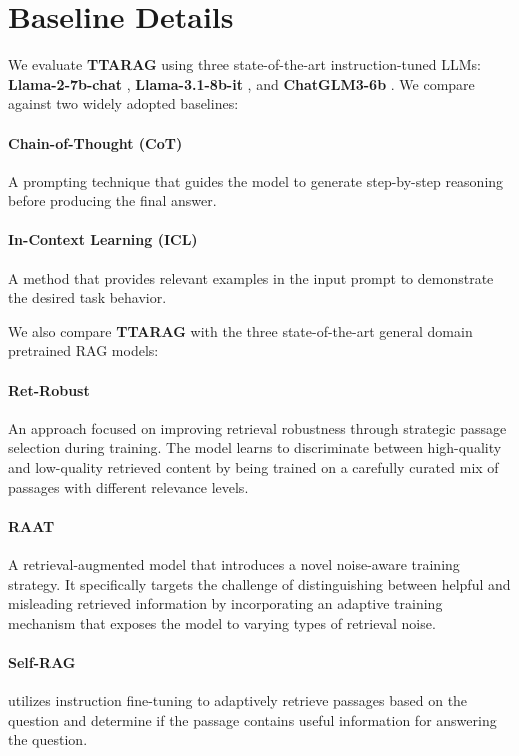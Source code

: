 \documentclass{article}
\newcommand{\ourmethod}{{\fontfamily{lmtt}\selectfont \textbf{TTARAG}}\xspace}
\begin{document}
\iffalse
\section{Baseline Details}
\label{appendix:baseline}
We evaluate \ourmethod{} using three state-of-the-art instruction-tuned LLMs: \textbf{Llama-2-7b-chat} \cite{touvron2023llama}, \textbf{Llama-3.1-8b-it} \cite{llama3}, and \textbf{ChatGLM3-6b} \cite{glm2024chatglm}. We compare against two widely adopted baselines:

\paragraph{Chain-of-Thought (CoT)} A prompting technique that guides the model to generate step-by-step reasoning before producing the final answer.

\paragraph{In-Context Learning (ICL)} A method that provides relevant examples in the input prompt to demonstrate the desired task behavior.

We also compare \ourmethod with the three state-of-the-art general domain pretrained RAG models:

\paragraph{Ret-Robust} An approach focused on improving retrieval robustness through strategic passage selection during training. The model learns to discriminate between high-quality and low-quality retrieved content by being trained on a carefully curated mix of passages with different relevance levels.

\paragraph{RAAT} A retrieval-augmented model that introduces a novel noise-aware training strategy. It specifically targets the challenge of distinguishing between helpful and misleading retrieved information by incorporating an adaptive training mechanism that exposes the model to varying types of retrieval noise.

\paragraph{Self-RAG} utilizes instruction
fine-tuning to adaptively retrieve passages based
on the question and determine if the passage contains useful information for answering the question.
\end{document}
